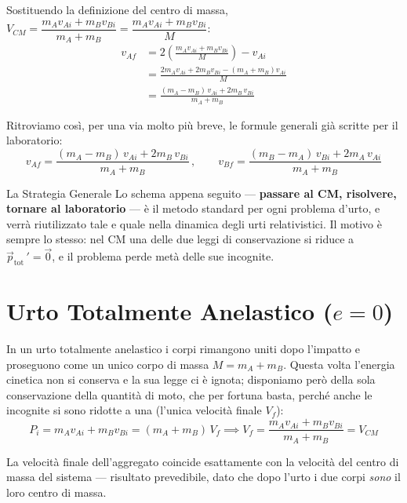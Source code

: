 Sostituendo la definizione del centro di massa, $V_{CM} = \dfrac{m_A v_{Ai} + m_B v_{Bi}}{m_A + m_B} = \dfrac{m_A v_{Ai} + m_B v_{Bi}}{M}$:
\begin{equation}
\begin{split}
    v_{Af} &= 2 \left( \frac{m_A v_{Ai} + m_B v_{Bi}}{M} \right) - v_{Ai} \\
           &= \frac{2m_A v_{Ai} + 2m_B v_{Bi} - (m_A + m_B)v_{Ai}}{M} \\
           &= \frac{(m_A - m_B)\,v_{Ai} + 2m_B \,v_{Bi}}{m_A + m_B}
\end{split}
\end{equation}

Ritroviamo così, per una via molto più breve, le formule generali già scritte per il laboratorio:
\begin{equation}
    v_{Af} = \frac{(m_A - m_B)\,v_{Ai} + 2m_B \,v_{Bi}}{m_A + m_B}
    \, , \qquad
    v_{Bf} = \frac{(m_B - m_A)\,v_{Bi} + 2m_A \,v_{Ai}}{m_A + m_B}
\end{equation}

\begin{osservazione}{La Strategia Generale}
Lo schema appena seguito --- \textbf{passare al CM, risolvere, tornare al laboratorio} --- è il metodo standard per ogni problema d'urto, e verrà riutilizzato tale e quale nella dinamica degli urti relativistici. Il motivo è sempre lo stesso: nel CM una delle due leggi di conservazione si riduce a $\vec{p}_{\text{tot}}\,' = \vec{0}$, e il problema perde metà delle sue incognite.
\end{osservazione}

\section{Urto Totalmente Anelastico ($e=0$)}

In un urto totalmente anelastico i corpi rimangono uniti dopo l'impatto e proseguono come un unico corpo di massa $M = m_A + m_B$. Questa volta l'energia cinetica non si conserva e la sua legge ci è ignota; disponiamo però della sola conservazione della quantità di moto, che per fortuna basta, perché anche le incognite si sono ridotte a una (l'unica velocità finale $V_f$):
\begin{equation}
    P_i = m_A v_{Ai} + m_B v_{Bi} = (m_A + m_B)\,V_f
    \implies V_f = \frac{m_A v_{Ai} + m_B v_{Bi}}{m_A + m_B} = V_{CM}
\end{equation}

La velocità finale dell'aggregato coincide esattamente con la velocità del centro di massa del sistema --- risultato prevedibile, dato che dopo l'urto i due corpi \emph{sono} il loro centro di massa.

